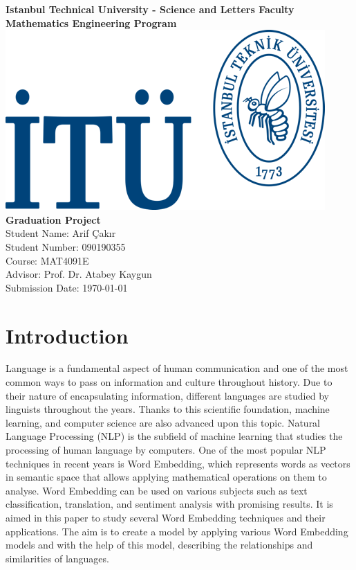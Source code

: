 \documentclass[man]{apa7}
\begin{document}
\begin{titlepage}
\centering
{\large \textbf{ Istanbul Technical University - Science and Letters Faculty}}\\
{\large \textbf{Mathematics Engineering Program}}\\[4\baselineskip]
\includegraphics[scale = 1.5]{itülogo.png}\\[6\baselineskip]
{\LARGE \textbf{Graduation Project}}\\[2\baselineskip]

{\Large Student Name: Arif Çakır}\\
{\large Student Number: 090190355}\\
{\large Course: MAT4091E}\\
{\large Advisor: Prof. Dr. Atabey Kaygun}\\
{\large Submission Date: \today}\\
\end{titlepage}
\tableofcontents
\pagebreak

\section{Introduction}
Language is a fundamental aspect of human communication and one of the most common ways to pass on information and culture throughout history. Due to their nature of encapsulating information, different languages are studied by linguists throughout the years. Thanks to this scientific foundation, machine learning, and computer science are also advanced upon this topic. Natural Language Processing (NLP) is the subfield of machine learning that studies the processing of human language by computers. One of the most popular NLP techniques in recent years is Word Embedding, which represents words as vectors in semantic space that allows applying mathematical operations on them to analyse. Word Embedding can be used on various subjects such as text classification, translation, and sentiment analysis with promising results. It is aimed in this paper to study several Word Embedding techniques and their applications. The aim is to create a model by applying various Word Embedding models and with the help of this model, describing the relationships and similarities of languages.
\end{document}
